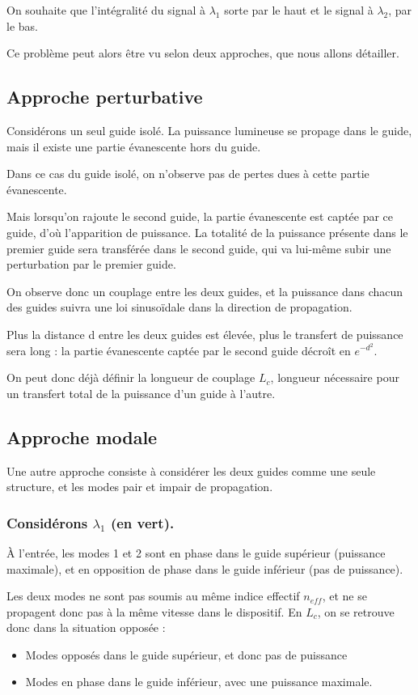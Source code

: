 \documentclass[a4paper,11pt]{report}
\begin{document}
On souhaite que l'intégralité du signal à $\lambda_1$ sorte par le haut et le signal à $\lambda_2$, par le bas.

Ce problème peut alors être vu selon deux approches, que nous allons détailler.

\subsection{Approche perturbative}
Considérons un seul guide isolé. La puissance lumineuse se propage dans le guide, mais il existe une partie évanescente hors du guide.

Dans ce cas du guide isolé, on n'observe pas de pertes dues à cette partie évanescente.

Mais lorsqu'on rajoute le second guide, la partie évanescente est captée par ce guide, d'où l'apparition de puissance. La totalité de la puissance présente dans le premier guide sera transférée dans le second guide, qui va lui-même subir une perturbation par le premier guide.

On observe donc un couplage entre les deux guides, et la puissance dans chacun des guides suivra une loi sinusoïdale dans la direction de propagation.

Plus la distance d entre les deux guides est élevée, plus le transfert de puissance sera long : la partie évanescente captée par le second guide décroît en $e^{-d^2}$.

On peut donc déjà définir la longueur de couplage $L_c$, longueur nécessaire pour un transfert total de la puissance d'un guide à l'autre.

\subsection{Approche modale}%
Une autre approche consiste à considérer les deux guides comme une seule structure, et les modes pair et impair de propagation.

\subsubsection*{Considérons $\lambda_1$ (en vert).}
À l'entrée, les modes 1 et 2 sont en phase dans le guide supérieur (puissance maximale), et en opposition de phase dans le guide inférieur (pas de puissance).

Les deux modes ne sont pas soumis au même indice effectif $n_{eff}$, et ne se propagent donc pas à la même vitesse dans le dispositif. \newline
En $L_c$, on se retrouve donc dans la situation opposée :
\begin{itemize}
    \item Modes opposés dans le guide supérieur, et donc pas de puissance
    \item Modes en phase dans le guide inférieur, avec une puissance maximale.
\end{itemize}
\end{document}
